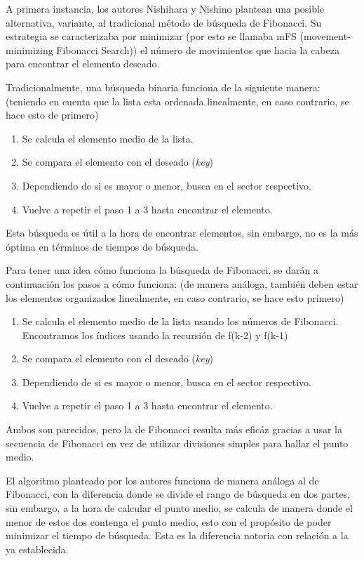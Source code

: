 \documentclass{article}
\begin{document}
A primera instancia, los autores Nishihara y Nishino plantean una posible alternativa, variante, al tradicional método de búsqueda de Fibonacci. Su estrategia se caracterizaba por minimizar (por esto se llamaba mFS (movement-minimizing Fibonacci Search)) el número de movimientos que hacia la cabeza para encontrar el elemento deseado.

Tradicionalmente, una búsqueda binaria funciona de la siguiente manera: (teniendo en cuenta que la lista esta ordenada linealmente, en caso contrario, se hace esto de primero)

\begin{enumerate}
    \item Se calcula el elemento medio de la lista.
    \item Se compara el elemento con el deseado (\textit{key})
    \item Dependiendo de si es mayor o menor, busca en el sector respectivo.
    \item Vuelve a repetir el paso 1 a 3 hasta encontrar el elemento.
\end{enumerate}

Esta búsqueda es útil a la hora de encontrar elementos, sin embargo, no es la más óptima en términos de tiempos de búsqueda. 

Para tener una idea cómo funciona la búsqueda de Fibonacci, se darán a continuación los pasos a cómo funciona: (de manera análoga, también deben estar los elementos organizados linealmente, en caso contrario, se hace esto primero)

\begin{enumerate}
    \item Se calcula el elemento medio de la lista usando los números de Fibonacci. Encontramos los índices usando la recursión de f(k-2) y f(k-1)
    \item Se compara el elemento con el deseado (\textit{key})
    \item Dependiendo de si es mayor o menor, busca en el sector respectivo.
    \item Vuelve a repetir el paso 1 a 3 hasta encontrar el elemento.
\end{enumerate}

Ambos son parecidos, pero la de Fibonacci resulta más eficáz gracias a usar la secuencia de Fibonacci en vez de utilizar divisiones simples para hallar el punto medio.

El algoritmo planteado por los autores funciona de manera análoga al de Fibonacci, con la diferencia donde se divide el rango de búsqueda en dos partes, sin embargo, a la hora de calcular el punto medio, se calcula de manera donde el menor de estos dos contenga el punto medio, esto con el propósito de poder minimizar el tiempo de búsqueda. Esta es la diferencia notoria con relación a la ya establecida.
\end{document}
